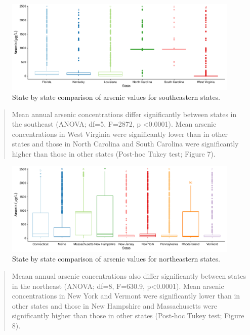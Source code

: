 \documentclass[12pt,]{article}
\begin{document}
\begin{figure}
\centering
\includegraphics{Project_Template_files/figure-latex/figs7-1.pdf}
\caption{State by state comparison of arsenic values for southeastern
states.}
\end{figure}

\begin{quote}
Mean annual arsenic concentrations differ significantly between states
in the southeast (ANOVA; df=5, F=2872, p \textless{}0.0001). Mean
arsenic concentrations in West Virginia were significantly lower than in
other states and those in North Carolina and South Carolina were
significantly higher than those in other states (Post-hoc Tukey test;
Figure 7).
\end{quote}

\begin{figure}
\centering
\includegraphics{Project_Template_files/figure-latex/figs8-1.pdf}
\caption{State by state comparison of arsenic values for northeastern
states.}
\end{figure}

\begin{quote}
Meaan annual arsenic concentrations also differ significantly between
states in the northeast (ANOVA; df=8, F=630.9, p\textless{}0.0001). Mean
arsenic concentrations in New York and Vermont were significantly lower
than in other states and those in New Hampshire and Massachusetts were
significantly higher than those in other states (Post-hoc Tukey test;
Figure 8).
\end{quote}
\end{document}
